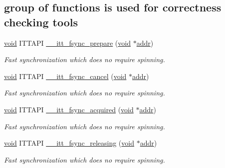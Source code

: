 \subsection*{group of functions is used for correctness checking tools}
\begin{DoxyCompactItemize}
\item 
\hyperlink{ittnotify__static_8h_af941d56e55e3c5465135b60c4d6343ed}{void} I\-T\-T\-A\-P\-I \hyperlink{group__legacy_ga529918590edeef71ffbe8c6692b7019c}{\-\_\-\-\_\-itt\-\_\-fsync\-\_\-prepare} (\hyperlink{ittnotify__static_8h_af941d56e55e3c5465135b60c4d6343ed}{void} $\ast$\hyperlink{ittnotify__static_8h_a7e21c61c16fffcc27199a9d66ff39ab8}{addr})
\begin{DoxyCompactList}\small\item\em Fast synchronization which does no require spinning. \end{DoxyCompactList}\item 
\hyperlink{ittnotify__static_8h_af941d56e55e3c5465135b60c4d6343ed}{void} I\-T\-T\-A\-P\-I \hyperlink{group__legacy_ga196fcb16865c3f9a316148fa620f7e13}{\-\_\-\-\_\-itt\-\_\-fsync\-\_\-cancel} (\hyperlink{ittnotify__static_8h_af941d56e55e3c5465135b60c4d6343ed}{void} $\ast$\hyperlink{ittnotify__static_8h_a7e21c61c16fffcc27199a9d66ff39ab8}{addr})
\begin{DoxyCompactList}\small\item\em Fast synchronization which does no require spinning. \end{DoxyCompactList}\item 
\hyperlink{ittnotify__static_8h_af941d56e55e3c5465135b60c4d6343ed}{void} I\-T\-T\-A\-P\-I \hyperlink{group__legacy_ga538018fcdc9be04929e3fdcaf444e3be}{\-\_\-\-\_\-itt\-\_\-fsync\-\_\-acquired} (\hyperlink{ittnotify__static_8h_af941d56e55e3c5465135b60c4d6343ed}{void} $\ast$\hyperlink{ittnotify__static_8h_a7e21c61c16fffcc27199a9d66ff39ab8}{addr})
\begin{DoxyCompactList}\small\item\em Fast synchronization which does no require spinning. \end{DoxyCompactList}\item 
\hyperlink{ittnotify__static_8h_af941d56e55e3c5465135b60c4d6343ed}{void} I\-T\-T\-A\-P\-I \hyperlink{group__legacy_ga67e0e05bdecc21673acecf207372b307}{\-\_\-\-\_\-itt\-\_\-fsync\-\_\-releasing} (\hyperlink{ittnotify__static_8h_af941d56e55e3c5465135b60c4d6343ed}{void} $\ast$\hyperlink{ittnotify__static_8h_a7e21c61c16fffcc27199a9d66ff39ab8}{addr})
\begin{DoxyCompactList}\small\item\em Fast synchronization which does no require spinning. \end{DoxyCompactList}\end{DoxyCompactItemize}


